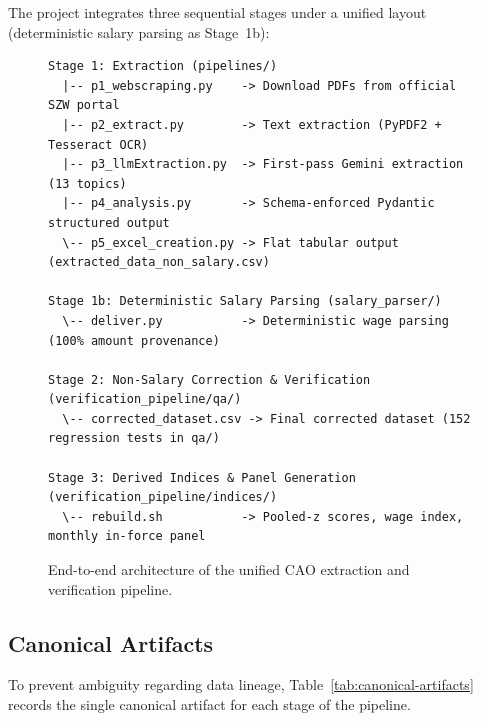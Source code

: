 The project integrates three sequential stages under a unified layout (deterministic salary parsing as Stage~1b):

\begin{figure}[!htbp]
\centering
\small
\begin{verbatim}
Stage 1: Extraction (pipelines/)
  |-- p1_webscraping.py    -> Download PDFs from official SZW portal
  |-- p2_extract.py        -> Text extraction (PyPDF2 + Tesseract OCR)
  |-- p3_llmExtraction.py  -> First-pass Gemini extraction (13 topics)
  |-- p4_analysis.py       -> Schema-enforced Pydantic structured output
  \-- p5_excel_creation.py -> Flat tabular output (extracted_data_non_salary.csv)

Stage 1b: Deterministic Salary Parsing (salary_parser/)
  \-- deliver.py           -> Deterministic wage parsing (100% amount provenance)

Stage 2: Non-Salary Correction & Verification (verification_pipeline/qa/)
  \-- corrected_dataset.csv -> Final corrected dataset (152 regression tests in qa/)

Stage 3: Derived Indices & Panel Generation (verification_pipeline/indices/)
  \-- rebuild.sh           -> Pooled-z scores, wage index, monthly in-force panel

\end{verbatim}
\caption{End-to-end architecture of the unified CAO extraction and verification pipeline.}
\label{fig:pipeline-arch}
\end{figure}

\subsection{Canonical Artifacts}
\label{subsec:canonical-artifacts}

To prevent ambiguity regarding data lineage, Table~\ref{tab:canonical-artifacts} records the single canonical artifact for each stage of the pipeline.

